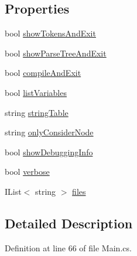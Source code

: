 \subsection*{Properties}
\begin{DoxyCompactItemize}
\item 
bool \hyperlink{a00171_ab1a387df201e3e136c15e5744219628d}{show\-Tokens\-And\-Exit}
\item 
bool \hyperlink{a00171_abef6bf44ae4792d7644b1c02de625208}{show\-Parse\-Tree\-And\-Exit}
\item 
bool \hyperlink{a00171_af9b6917244075618720f2a90bbe6ef56}{compile\-And\-Exit}
\item 
bool \hyperlink{a00171_a062775744f2d7144527fa3bca4b9b3ce}{list\-Variables}
\item 
string \hyperlink{a00101_a7e43c3b73722956cb0f5d507e4eef527}{string\-Table}
\item 
string \hyperlink{a00101_af4c0062a1d46281d377f87084fde374e}{only\-Consider\-Node}
\item 
bool \hyperlink{a00042_a89964ea17bd19caf00cb5bff563ed01c}{show\-Debugging\-Info}
\item 
bool \hyperlink{a00042_ada4d83d1756918f362d55f6649b82b17}{verbose}
\item 
I\-List$<$ string $>$ \hyperlink{a00042_aa93cbb1bc1d5328e0a417012621e92d2}{files}
\end{DoxyCompactItemize}


\subsection{Detailed Description}


Definition at line 66 of file Main.\-cs.



